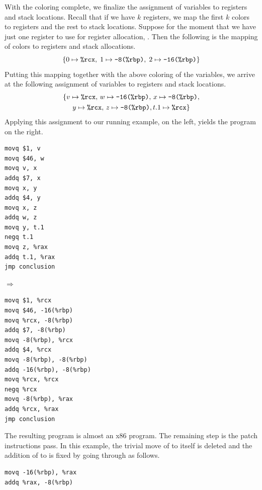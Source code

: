 \documentclass[11pt]{book}
\begin{document}
With the coloring complete, we finalize the assignment of variables to
registers and stack locations. Recall that if we have $k$ registers,
we map the first $k$ colors to registers and the rest to stack
locations.  Suppose for the moment that we have just one register to
use for register allocation, . Then the following is the
mapping of colors to registers and stack allocations.
\[
  \{ 0 \mapsto \texttt{\%rcx}, \; 1 \mapsto \texttt{-8(\%rbp)}, \; 2 \mapsto \texttt{-16(\%rbp)} \}
\]
Putting this mapping together with the above coloring of the
variables, we arrive at the following assignment of variables to
registers and stack locations.
\begin{gather*}
  \{ v \mapsto \texttt{\%rcx}, \,
  w \mapsto \texttt{-16(\%rbp)},  \,
  x \mapsto \texttt{-8(\%rbp)}, \\
  y \mapsto \texttt{\%rcx},  \,
  z\mapsto \texttt{-8(\%rbp)}, 
  t.1\mapsto \texttt{\%rcx} \}
\end{gather*}
Applying this assignment to our running example, on the left, yields
the program on the right.
\begin{center}
  \begin{minipage}{0.3\textwidth}
\begin{lstlisting}
movq $1, v
movq $46, w
movq v, x
addq $7, x
movq x, y
addq $4, y
movq x, z
addq w, z
movq y, t.1
negq t.1
movq z, %rax
addq t.1, %rax
jmp conclusion
\end{lstlisting}
\end{minipage}
$\Rightarrow\qquad$
\begin{minipage}{0.45\textwidth}
\begin{lstlisting}
movq $1, %rcx
movq $46, -16(%rbp)
movq %rcx, -8(%rbp)
addq $7, -8(%rbp)
movq -8(%rbp), %rcx
addq $4, %rcx
movq -8(%rbp), -8(%rbp)
addq -16(%rbp), -8(%rbp)
movq %rcx, %rcx
negq %rcx
movq -8(%rbp), %rax
addq %rcx, %rax
jmp conclusion
\end{lstlisting}
\end{minipage}
\end{center}

The resulting program is almost an x86 program. The remaining step is
the patch instructions pass. In this example, the trivial move of
 to itself is deleted and the addition of
 to  is fixed by going through
 as follows.
\begin{lstlisting}
movq -16(%rbp), %rax
addq %rax, -8(%rbp)
\end{lstlisting}
\end{document}
